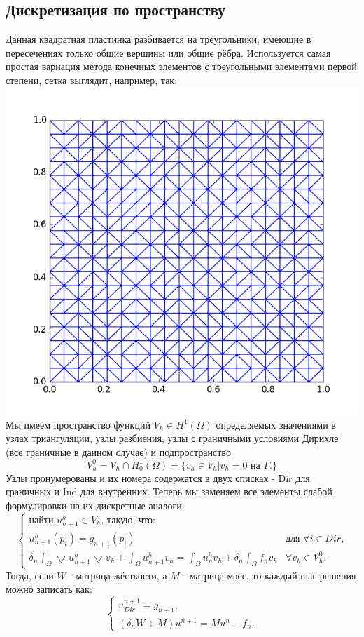 \documentclass[paper=a4, fontsize=13pt]{scrartcl} %
\numberwithin{equation}{section} %
\numberwithin{figure}{section} %
\numberwithin{table}{section} %
\begin{document}
\subsection{Дискретизация по пространству}
Данная квадратная пластинка разбивается на треугольники, имеющие в пересечениях только общие вершины или общие рёбра.
Используется самая простая вариация метода конечных элементов с треугольными элементами первой степени, сетка выглядит, например, так: \\
\includegraphics[scale=0.5]{mesh} \\
Мы имеем пространство функций $V_h \in H^1(\Omega)$ определяемых значениями в узлах триангуляции, узлы разбиения, узлы с граничными условиями Дирихле (все граничные в данном случае) и подпространство $$V^0_h = V_h \cap H^1_0(\Omega) = \{v_h \in V_h | v_h = 0 \text{ на $\Gamma$.}\}$$ Узлы пронумерованы и их номера содержатся в двух списках - Dir для граничных и Ind для внутренних. Теперь мы заменяем все элементы слабой формулировки на их дискретные аналоги:
    \[
        \begin{cases}
            \text{найти } u^h_{n+1} \in V_h\text{, такую, что:} \\
            u^h_{n+1}(p_i) = g_{n+1}(p_i)& \text{для $\forall i \in Dir$,} \\
            \delta_n \int_{\Omega} \bigtriangledown u^h_{n+1} \bigtriangledown v_h + \int_{\Omega} u^h_{n+1}v_h = \int_{\Omega} u^h_{n}v_h + \delta_n \int_{\Omega} f_{n}v_h& \forall v_h \in V^0_h.
        \end{cases}
    \]
Тогда, если $W$ - матрица жёсткости, а $M$ - матрица масс, то каждый шаг решения можно записать как:
    \[
        \begin{cases}
            u^{n+1}_{Dir} = g_{n+1}, \\
            (\delta_n W + M) u^{n+1} = M u^n - f_n.
        \end{cases}
    \]
\end{document}
